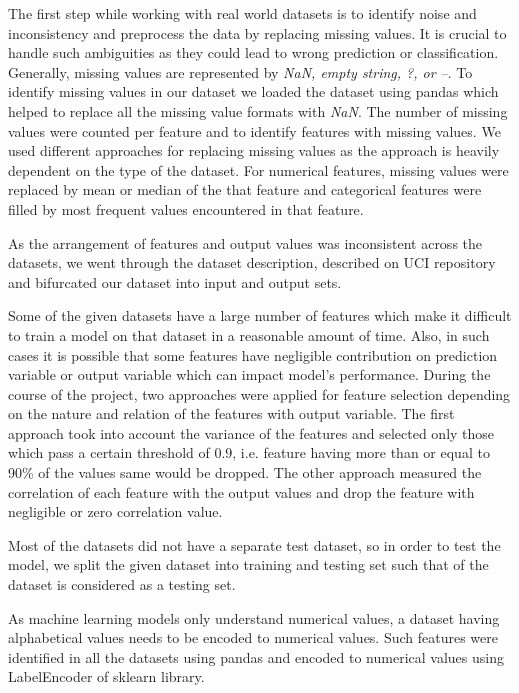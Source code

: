 \documentclass[10pt,twocolumn,letterpaper]{article}
\begin{document}
The first step while working with real world datasets is to identify noise
and inconsistency and preprocess the data by replacing missing values. It is
crucial to handle such ambiguities as they could lead to wrong prediction or
classification. Generally, missing values are represented by \textit{NaN,
empty string, ?, or --}. To identify missing values in our dataset we loaded
the dataset using pandas which helped to replace all the missing value
formats with \textit{NaN}. The number of missing values were counted per feature and
to identify features with missing values. We used different approaches for
replacing missing values as the approach is heavily dependent on the type of
the dataset. For numerical features, missing values were replaced by mean or
median of the that feature and categorical features were filled by most
frequent values encountered in that feature.

As the arrangement of features and output values was inconsistent across the datasets, we went through the dataset description, described on UCI repository and bifurcated our dataset into input and output sets.

Some of the given datasets have a large number of features which make it difficult to train a model on that dataset in a reasonable amount of time. Also, in such cases it is possible that some features have negligible contribution on prediction variable or output variable which can impact model’s performance. During the course of the project, two approaches were applied for feature selection depending on the nature and relation of the features with output variable. The first approach took into account the variance of the features and selected only those which pass a certain threshold of 0.9, i.e. feature having more than or equal to 90\% of the values same would be dropped. The other approach measured the correlation of each feature with the output values and drop the feature with negligible or zero correlation value.

Most of the datasets did not have a separate test dataset, so in order to test the model, we split the given dataset into training and testing set such that  of the dataset is considered as a testing set.

As machine learning models only understand numerical values, a dataset having alphabetical values needs to be encoded to numerical values. Such features were identified in all the datasets using pandas and encoded to numerical values using LabelEncoder of sklearn library.
\end{document}

